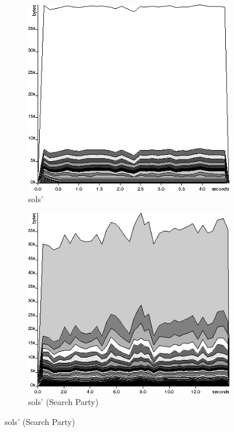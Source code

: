 \begin{figure}[t]
  \begin{subfigure}{0.4\textwidth}
    \includegraphics[width=\textwidth]{space/sols2-orig}
    \caption{sols'}
    \label{fig:examples-space:sols2-orig}
  \end{subfigure}
  \begin{subfigure}{0.4\textwidth}
    \includegraphics[width=\textwidth]{space/sols2-sp}
    \caption{sols' (Search Party)}
    \label{fig:examples-space:sols2-sp}
  \end{subfigure}


\end{figure}
